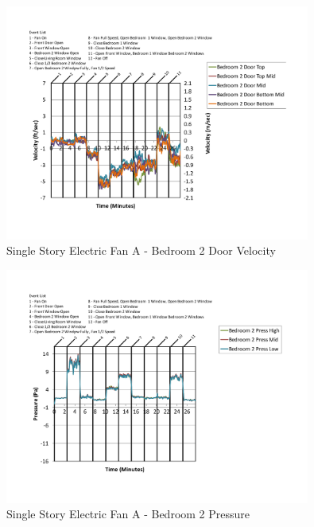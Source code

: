\documentclass{article}
\begin{document}
\begin{appendices}
	\begin{figure}[H]
		\centering
		\includegraphics[height=3.05in,trim=0.67in 1.1in 0.67in 0.8in,clip=true]{0_Images/Results_Charts/ColdFlow/Single_Story/Electric/A/Bedroom_2_Door_Velocity.pdf}
		\caption{Single Story Electric Fan A - Bedroom 2 Door Velocity}
	\end{figure}
 

	\begin{figure}[H]
		\centering
		\includegraphics[height=3.05in,trim=0.67in 1.1in 0.67in 0.8in,clip=true]{0_Images/Results_Charts/ColdFlow/Single_Story/Electric/A/Bedroom_2_Pressure.pdf}
		\caption{Single Story Electric Fan A - Bedroom 2 Pressure}
	\end{figure}
 
	\clearpage


\end{appendices}
\end{document}
